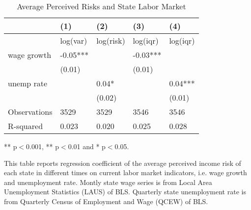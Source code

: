 	\begin{table}[ht]
		\centering
		\begin{adjustbox}{width=0.5\textwidth}
			\begin{threeparttable}
			\caption{Average Perceived Risks and State Labor Market}
			\label{macro_corr_he_state}
			\begin{tabular}{lllll}
				\hline 
				& (1)                & (2)                & (3)               & (4)               \\
				\hline 
				& log(var) & log(risk) & log(iqr) & log(iqr) \\
				\hline 
				wage growth & -0.05***           &                    & -0.03***          &                   \\
				
				& (0.01)             &                    & (0.01)            &                   \\
				unemp rate &                    & 0.04*              &                   & 0.04***           \\
				&                    & (0.02)             &                   & (0.01)            \\
				\hline 
				Observations      & 3529               & 3529               & 3546              & 3546              \\
				R-squared         & 0.023              & 0.020              & 0.025             & 0.028            \\
				\hline 
			\end{tabular}
			
				\begin{tablenotes}
					\item *** p$<$0.001, ** p$<$0.01 and * p$<$0.05.
					\item This table reports regression coefficient of the average perceived income risk of each state in different times on current labor market indicators, i.e. wage growth and unemployment rate. Montly state wage series is from Local Area Unemployment Statistics (LAUS) of BLS. Quarterly state unemployment rate is from Quarterly Census of Employment and Wage (QCEW) of BLS. 
				\end{tablenotes}
			\end{threeparttable}
		\end{adjustbox}
	\end{table}
